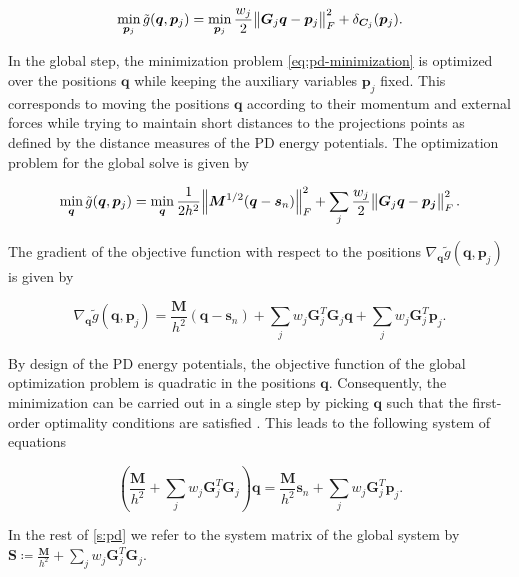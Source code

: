 \begin{equation}\label{eq:pd-local-minimization}
    \min_{\bm{p}_j} \tilde{g}(\bm{q}, \bm{p}_j) =
    \min_{\bm{p}_j} \frac{w_j}{2}\norm{\bm{G}_j\bm{q} - \bm{p}_j}^2_F + \delta_{\bm{C}_j}(\bm{p}_j).
\end{equation}

In the global step, the minimization problem \cref{eq:pd-minimization} is optimized over the positions $\bm{q}$ while keeping the auxiliary 
variables $\bm{p}_j$ fixed.
This corresponds to moving the positions $\bm{q}$ according to their momentum and external forces while trying to maintain short distances
to the projections points as defined by the distance measures of the PD energy potentials. The optimization problem for the global solve is 
given by

\begin{equation}\label{eq:pd-global-minimization}
    \min_{\bm{q}} \tilde{g}(\bm{q}, \bm{p}_j) =
    \min_{\bm{q}} \frac{1}{2h^2} \norm{\bm{M}^{1/2}(\bm{q} - \bm{s}_n)}^2_F + \sum_j \frac{w_j}{2} \norm{\bm{G}_j\bm{q} - \bm{p_j}}^2_F.
\end{equation}

\noindent The gradient of the objective function with respect to the positions $\nabla_{\bm{q}} 
\tilde{g}(\bm{q}, \bm{p}_j)$ is given by 

\begin{equation}\label{eq:pd-gradient-q}
    \nabla_{\bm{q}}\tilde{g}(\bm{q}, \bm{p}_j) = \frac{\bm{M}}{h^2}(\bm{q} - \bm{s}_n) + \sum_j w_j \bm{G}^T_j \bm{G}_j \bm{q}
    + \sum_j w_j \bm{G}^T_j \bm{p}_j.
\end{equation}

\noindent By design of the PD energy potentials, the objective function of the global optimization problem is quadratic in the positions 
$\bm{q}$. Consequently, the minimization can be carried out in a single step by picking $\bm{q}$ such that the first-order optimality 
conditions are satisfied \cite{nocedal2006}. This leads to the following system of equations

\begin{equation}\label{eq:pd-global-system}
    (\frac{\bm{M}}{h^2} + \sum_j w_j \bm{G}_j^T \bm{G}_j)\bm{q} = \frac{\bm{M}}{h^2}\bm{s}_n + \sum_j w_j \bm{G}_j^T \bm{p}_j.
\end{equation}

\noindent In the rest of \cref{s:pd} we refer to the system matrix of the global system by 
$\bm{S} \coloneqq \frac{\bm{M}}{h^2} + \sum_j w_j \bm{G}_j^T \bm{G}_j$.

